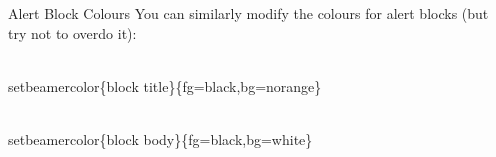 \documentclass[final]{beamer}
\newlength{\sepwid}
\newlength{\introcolwid}
\begin{document}
\begin{frame}[t]
\begin{columns}[t]
\begin{column}{\introcolwid}
      \begin{alertblock}{Alert Block Colours}
        You can similarly modify the colours for alert blocks (but try not to overdo it):\\
        \begin{semiverbatim}
          {\color{red}\\setbeamercolor}\{block title\}\newline \{fg=black,bg=norange\}
        \end{semiverbatim}
        \begin{semiverbatim}
          {\color{red}\\setbeamercolor}\{block  body\}\newline \{fg=black,bg=white\}
        \end{semiverbatim}
      \end{alertblock}        
    \end{column}
	\begin{column}{\sepwid}\end{column}			%
\end{columns}
\end{frame}
\end{document}
